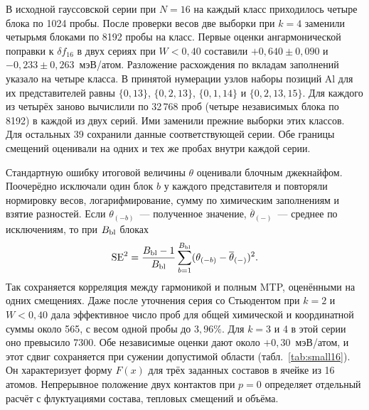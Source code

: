 В исходной гауссовской серии при $N=16$ на каждый класс
приходилось четыре блока по 1024 пробы. После проверки весов две выборки
при $k=4$ заменили четырьмя блоками по 8192 пробы на класс. Первые оценки ангармонической поправки к
$\delta f_{16}$ в двух сериях при $W<0{,}40$ составили $+0{,}640\pm0{,}090$
и $-0{,}233\pm0{,}263$~мэВ/атом. Разложение расхождения по вкладам заполнений
указало на четыре класса. В принятой нумерации узлов наборы позиций Al для
их представителей равны $\{0,13\}$, $\{0,2,13\}$, $\{0,1,14\}$ и
$\{0,2,13,15\}$. Для каждого из четырёх заново вычислили по 32\,768 проб
(четыре независимых блока по 8192) в каждой из двух серий. Ими заменили
прежние выборки этих классов. Для остальных 39 сохранили данные
соответствующей серии. Обе границы смещений оценивали на одних и тех же
пробах внутри каждой серии.

Стандартную ошибку итоговой величины $\theta$ оценивали блочным
джекнайфом. Поочерёдно исключали один блок $b$ у каждого представителя
и повторяли нормировку весов, логарифмирование, сумму по химическим
заполнениям и взятие разностей. Если $\theta_{(-b)}$~--- полученное
значение, $\overline{\theta}_{(-)}$~--- среднее по исключениям, то при
$B_{\rm bl}$ блоках
\[
 {\rm SE}^2=\frac{B_{\rm bl}-1}{B_{\rm bl}}
 \sum_{b=1}^{B_{\rm bl}}(\theta_{(-b)}-\overline{\theta}_{(-)})^2 .
\]
Так сохраняется корреляция между гармоникой и полным MTP, оценёнными на
одних смещениях. Даже после уточнения серия со Стьюдентом при $k=2$ и
$W<0{,}40$ дала эффективное число проб для общей химической и координатной
суммы около 565, с весом одной пробы до $3{,}96\%$. Для $k=3$ и 4
в этой серии оно превысило 7300. Обе независимые оценки дают около
$+0{,}30$~мэВ/атом, и этот сдвиг сохраняется при сужении допустимой
области (табл.~\ref{tab:small16}). Он характеризует
форму $F(x)$ для трёх заданных составов в ячейке из 16 атомов. Непрерывное
положение двух контактов при $p=0$ определяет отдельный расчёт с флуктуациями
состава, тепловых смещений и объёма.
